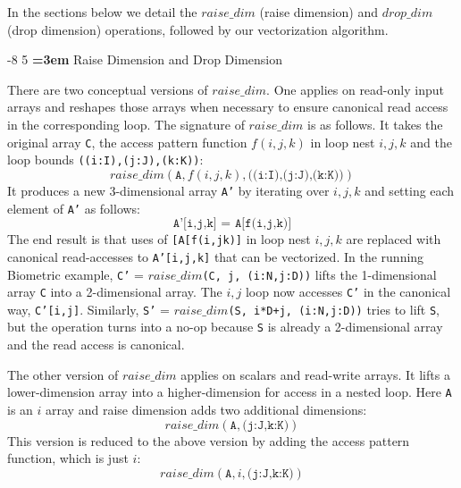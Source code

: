 \documentclass[sigconf, screen, natbib=false, dvipsnames, table]{acmart}
\makeatletter
\renewcommand{\subsection}{\@startsection{subsection}{2}{\z@}%
                        {-8\p@ \@plus -4\p@ \@minus -4\p@}%
                        {5\p@ \@plus 2\p@ \@minus 2\p@}%
                        {\normalfont\Large\bfseries\boldmath
                         \rightskip=\z@ \@plus 3em\pretolerance=10000 }}
\theoremstyle{definition}
\makeatother
\begin{document}
In the sections below we detail the $\mathit{raise\_dim}$ (raise dimension) and $\mathit{drop\_dim}$ (drop dimension) operations,
followed by our vectorization algorithm.



\subsection{Raise Dimension and Drop Dimension}

There are two conceptual versions of $\mathit{raise\_dim}$. One applies on read-only input arrays and reshapes those arrays 
when necessary to ensure canonical read access in the corresponding loop. The signature of $\mathit{raise\_dim}$
is as follows. It takes the original array \texttt{C}, the access pattern function $f(i,j,k)$ in loop nest $i,j,k$ and the loop bounds
\texttt{((i:I),(j:J),(k:K))}: 
\[ \mathit{raise\_dim}(\texttt{A}, f(i,j,k), \texttt{((i:I),(j:J),(k:K))}) \]
It produces a new 3-dimensional array \texttt{A'} by iterating over $i,j,k$ and setting each element of  \texttt{A'} as follows:
\[ \texttt{A'[i,j,k] =  A[f(i,j,k)]} \]
The end result is that uses of \texttt{[A[f(i,jk)]} in loop nest $i,j,k$ are replaced with canonical read-accesses to \texttt{A'[i,j,k]}
that can be vectorized. In the running Biometric example, \texttt{C'} = $\mathit{raise\_dim}$\texttt{(C, j, (i:N,j:D))} lifts the 
1-dimensional array \texttt{C} into a 2-dimensional array. The $i,j$ loop now accesses \texttt{C'} in the canonical way, \texttt{C'[i,j]}. 
Similarly, \texttt{S'} = $\mathit{raise\_dim}$\texttt{(S, i*D+j, (i:N,j:D))} tries to lift \texttt{S}, but the operation turns into a no-op 
because \texttt{S} is already a 2-dimensional array and the read access is canonical. 

The other version of $\mathit{raise\_dim}$ applies on scalars and read-write arrays. It lifts a lower-dimension array into a 
higher-dimension for access in a nested loop. Here \texttt{A} is an $i$ array and raise dimension adds two additional dimensions:
\[ \mathit{raise\_dim}(\texttt{A}, \texttt{(j:J,k:K)}) \]
This version is reduced to the above version by adding the access pattern function, which is just $i$: 
\[ \mathit{raise\_dim}(\texttt{A}, i, \texttt{(j:J,k:K)}) \]
\end{document}
